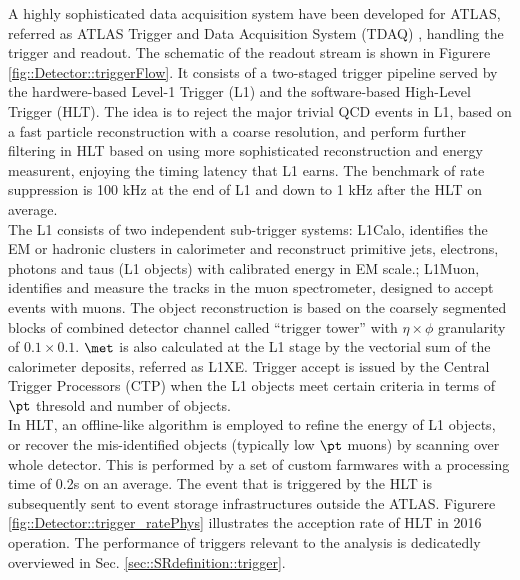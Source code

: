 A highly sophisticated data acquisition system have been developed for ATLAS, referred as ATLAS Trigger and Data Acquisition System (TDAQ) \cite{ATLASTrigger2015}, handling the trigger and readout. The schematic of the readout stream is shown in Figurere \ref{fig::Detector::triggerFlow}.
It consists of a two-staged trigger pipeline served by the hardwere-based Level-1 Trigger (L1) and the software-based High-Level Trigger (HLT).
The idea is to reject the major trivial QCD events in L1, based on a fast particle reconstruction with a coarse resolution, and perform further filtering in HLT based on using more sophisticated reconstruction and energy measurent, enjoying the timing latency that L1 earns. The benchmark of rate suppression is 100 kHz at the end of L1 and down to 1 kHz after the HLT on average. \\
The L1 consists of two independent sub-trigger systems: L1Calo, identifies the EM or hadronic clusters in calorimeter and reconstruct primitive jets, electrons, photons and taus (L1 objects) with calibrated energy in EM scale.; L1Muon, identifies and measure the tracks in the muon spectrometer, designed to accept events with muons. 
The object reconstruction is based on the coarsely segmented blocks of combined detector channel called ``trigger tower'' with $\eta\times\phi$ granularity of $0.1 \times 0.1$. 
$\met$ is also calculated at the L1 stage by the vectorial sum of the calorimeter deposits, referred as L1XE. Trigger accept is issued by the Central Trigger Processors (CTP) when the L1 objects meet certain criteria in terms of $\pt$ thresold and number of objects.  \\

In HLT, an offline-like algorithm is employed to refine the energy of L1 objects, or recover the mis-identified objects (typically low $\pt$ muons) by scanning over whole detector. This is performed by a set of custom farmwares with a processing time of 0.2s on an average. The event that is triggered by the HLT is subsequently sent to event storage infrastructures outside the ATLAS. 
Figurere \ref{fig::Detector::trigger_ratePhys} illustrates the acception rate of HLT in 2016 operation. 
The performance of triggers relevant to the analysis is dedicatedly overviewed in Sec. \ref{sec::SRdefinition::trigger}.


